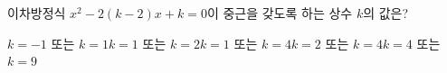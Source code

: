이차방정식 $x^2-2(k-2)x+k=0$이 중근을 갖도록 하는 상수 $k$의 값은?
\begin{choicesii}{$k=-1$ 또는 $k=1$}{$k=1$ 또는 $k=2$}{$k=1$ 또는 $k=4$}{$k=2$ 또는 $k=4$}{$k=4$ 또는 $k=9$}\end{choicesii}

